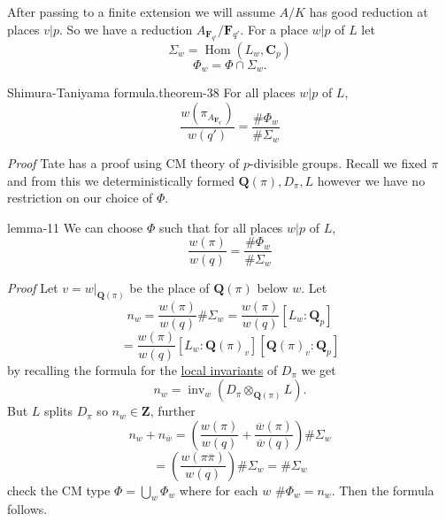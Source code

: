 \documentclass[10pt,]{book}
\makeatletter
\renewcommand*{\proofname}{Proof}
\renewenvironment{proof}[1][\proofname]{\par
  \pushQED{\qed}%
  \normalfont \topsep6\p@\@plus6\p@\relax
  \trivlist
  \item\relax
    {\itshape
    #1\@addpunct{.}}\hspace\labelsep\ignorespaces
}{%
  \popQED\endtrivlist\@endpefalse
}
\numberwithin{equation}{section}
\newcommand{\ZZ}{\mathbf{Z}}
\newcommand{\QQ}{\mathbf{Q}}
\newcommand{\CC}{\mathbf{C}}
\newcommand{\FF}{\mathbf{F}}
\DeclareMathOperator{\Hom}{Hom}
\makeatother
\begin{document}
\hypertarget{p-449}{}%
After passing to a finite extension we will assume \(A/K\) has good reduction at places \(v|p\). So we have a reduction \(A_{\FF_{q'}}/\FF_{q'}\). For a place \(w|p\) of \(L\) let%
\begin{equation*}
\Sigma_w = \Hom(L_w, \CC_p)
\end{equation*}
%
\begin{equation*}
\Phi_w = \Phi \cap \Sigma_w\text{.}
\end{equation*}
%
\begin{theorem}{Shimura-Taniyama formula.}{}{theorem-38}%
\hypertarget{p-450}{}%
For all places \(w|p\) of \(L\),%
\begin{equation*}
\frac{w(\pi_{A_{\FF_{q'}}})}{w(q')} = \frac{\#\Phi_w}{\#\Sigma_w}
\end{equation*}
%
\end{theorem}
\begin{proof}\hypertarget{proof-78}{}
\hypertarget{p-451}{}%
Tate has a proof using CM theory of \(p\)-divisible groups.%
\end{proof}
\hypertarget{p-452}{}%
Recall we fixed \(\pi\) and from this we deterministically formed \(\QQ(\pi), D_{\pi}, L\) however we have no restriction on our choice of \(\Phi\).%
\begin{lemma}{}{}{lemma-11}%
\hypertarget{p-453}{}%
We can choose \(\Phi\) such that for all places \(w|p\) of \(L\),%
\begin{equation*}
\frac{w(\pi)}{w(q)} = \frac{\#\Phi_w}{\#\Sigma_w}
\end{equation*}
%
\end{lemma}
\begin{proof}\hypertarget{proof-79}{}
\hypertarget{p-454}{}%
Let \(v = w|_{\QQ(\pi)}\) be the place of \(\QQ(\pi)\) below \(w\). Let%
\begin{equation*}
n_w = \frac{w(\pi)}{w(q)}\#\Sigma_w = \frac{w(\pi)}{w(q)}[L_w :\QQ_p]
\end{equation*}
%
\begin{equation*}
= \frac{w(\pi)}{w(q)}[L_w :\QQ(\pi)_v ][ \QQ(\pi)_v:\QQ_p]
\end{equation*}
by recalling the formula for the \hyperref[def-brauer-gp]{local invariants} of \(D_\pi\) we get%
\begin{equation*}
n_w = \operatorname{inv}_w(D_\pi\otimes_{\QQ(\pi)} L)\text{.}
\end{equation*}
But \(L\) splits \(D_\pi\) so \(n_w \in \ZZ\), further%
\begin{equation*}
n_w + n_{\overline w} = \left( \frac{w(\pi)}{w(q)}  + \frac{\overline w(\pi)}{\overline w(q)} \right) \#\Sigma_w
\end{equation*}
%
\begin{equation*}
= \left( \frac{w(\pi\overline \pi)}{w(q)} \right) \#\Sigma_w = \#\Sigma_w
\end{equation*}
check the CM type \(\Phi = \bigcup_w \Phi_w\) where for each \(w\) \(\# \Phi_w = n_w\). Then the formula follows.%
\end{proof}
\end{document}
